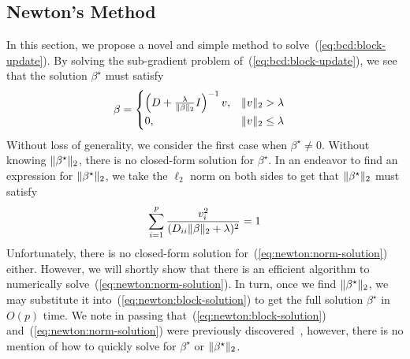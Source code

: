 \subsection{Newton's Method}\label{ssec:newton}

In this section, we propose a novel and simple method to solve~(\ref{eq:bcd:block-update}).
By solving the sub-gradient problem of~(\ref{eq:bcd:block-update}),
we see that the solution $\beta^\star$ must satisfy
\begin{align}
    \beta
    &=
    \begin{cases}
    \left(D + \frac{\lambda}{\|\beta\|_2} I\right)^{-1} v ,& \|v\|_2 > \lambda \\
    0 ,& \|v\|_2 \leq \lambda
    \end{cases}
    \label{eq:newton:block-solution}
\end{align}
Without loss of generality, we consider the first case when $\beta^\star \neq 0$.
Without knowing $\|\beta^\star\|_2$, there is no closed-form solution for $\beta^\star$.
In an endeavor to find an expression for $\|\beta^\star\|_2$,
we take the $\ell_2$ norm on both sides to get that $\|\beta^\star\|_2$ must satisfy
\begin{align}
    \sum\limits_{i=1}^p
    \frac{v_i^2}{(D_{ii} \|\beta\|_2 + \lambda)^2}
    =
    1
    \label{eq:newton:norm-solution}
\end{align}
Unfortunately, there is no closed-form solution for~(\ref{eq:newton:norm-solution}) either.
However, we will shortly show that there is an efficient algorithm 
to numerically solve~(\ref{eq:newton:norm-solution}).
In turn, once we find $\|\beta^\star\|_2$, we may substitute it
into~(\ref{eq:newton:block-solution}) to get the full solution $\beta^\star$ in $O(p)$ time.
We note in passing that~(\ref{eq:newton:block-solution}) and~(\ref{eq:newton:norm-solution})
were previously discovered~\citep{sls:2016},
however, there is no mention of how to quickly solve for $\beta^\star$ or $\|\beta^\star\|_2$.

